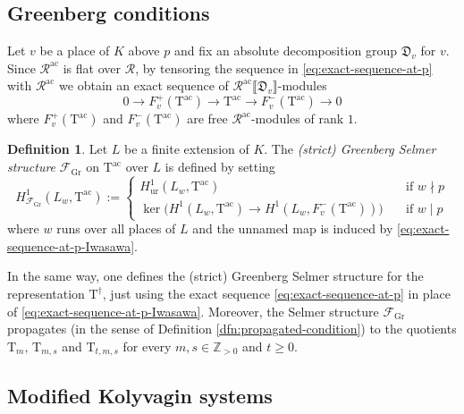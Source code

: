 \documentclass[12pt,reqno]{amsart}
\theoremstyle{definition}
\newtheorem{definition}[theorem]{Definition}
\theoremstyle{remark}
\newcommand{\numberset}{\mathbb}
\newcommand{\Z}{\numberset{Z}}
\newcommand{\T}{\boldsymbol{\mathrm{T}}}
\newcommand{\ac}{\mathrm{ac}}
\newcommand{\Gr}{\mathrm{Gr}}
\newcommand{\ur}{\mathrm{ur}}
\begin{document}
\subsection{Greenberg conditions}

Let $v$ be a place of $K$ above $p$ and fix an absolute decomposition group $\mathfrak{D}_v$ for $v$. Since $\mathcal{R}^{\ac}$ is flat over $\mathcal{R}$, by tensoring the sequence in \eqref{eq:exact-sequence-at-p} with $\mathcal{R}^{\ac}$ we obtain an exact sequence of $\mathcal{R}^\ac\llbracket \mathfrak{D}_v\rrbracket$-modules
\begin{equation}\label{eq:exact-sequence-at-p-Iwasawa}
            0\longrightarrow F_v^+(\T^{\ac})\longrightarrow \T^{\ac}\longrightarrow F_v^-(\T^{\ac})\longrightarrow 0
\end{equation}
 where $F_v^+(\T^{\ac})$ and $F_v^-(\T^{\ac})$ are free $\mathcal{R}^{\ac}$-modules of rank $1$.

 \begin{definition}\label{dfn:strict-Greenberg-selmer-structure}
        Let $L$ be a finite extension of $K$. The \emph{(strict) Greenberg Selmer structure} $\mathcal{F}_{\Gr}$ on $\T^{\ac}$ over $L$ is defined by setting 
        \begin{equation*}
            H^1_{\mathcal{F}_{\Gr}}(L_w,\T^{\ac}):=\begin{cases}
                H_{\ur}^1(L_w,\T^{\ac})\quad &\text{if $w\nmid p$}\\
                \ker\big(H^1(L_w,\T^{\ac})\to H^1(L_w,F_v^-(\T^{\ac}))\big)\quad &\text{if $w\mid p$}
            \end{cases}
        \end{equation*}
        where $w$ runs over all places of $L$ and the unnamed map is induced by \eqref{eq:exact-sequence-at-p-Iwasawa}.
    \end{definition}

    In the same way, one defines the (strict) Greenberg Selmer structure for the representation $\T^{\dag}$, just using the exact sequence  \eqref{eq:exact-sequence-at-p} in place of \eqref{eq:exact-sequence-at-p-Iwasawa}. Moreover, the Selmer structure $\mathcal{F}_{\Gr}$ propagates (in the sense of Definition \ref{dfn:propagated-condition}) to the quotients $\T_m$, $\T_{m,s}$ and $\T_{t,m,s}$ for every $m,s\in\Z_{>0}$ and $t\ge 0$.


\subsection{Modified Kolyvagin systems}\label{sec:modified-Kolyvagin-systems}
\end{document}
